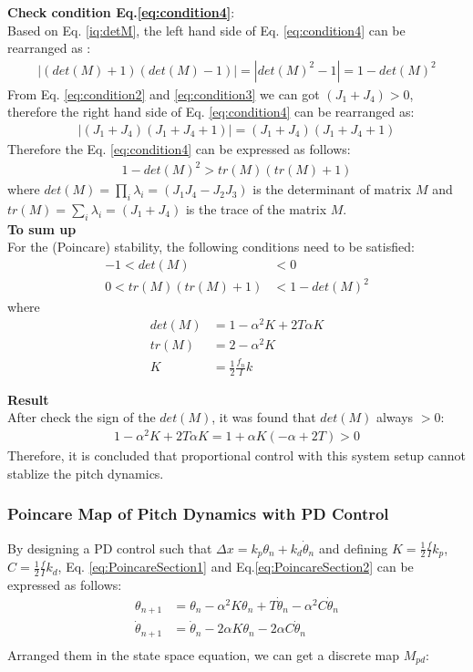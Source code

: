 \noindent \textbf{Check condition Eq.\ref{eq:condition4}}:\\
Based on Eq. \ref{iq:detM}, the left hand side of Eq. \ref{eq:condition4} can be rearranged as :
\begin{align*}
|(det(M)+1)(det(M)-1)| = |det(M)^2-1| = 1-det(M)^2
\end{align*}
From Eq. \ref{eq:condition2} and \ref{eq:condition3} we can got $(J_1+J_4)>0$, therefore the right hand side of Eq. \ref{eq:condition4} can be rearranged as:
\begin{align*}
|(J_1+J_4)(J_1+J_4 +1)| = (J_1+J_4)(J_1+J_4 +1)
\end{align*}
Therefore the Eq. \ref{eq:condition4} can be expressed as follows:
\begin{align*}
1-det(M)^2> tr(M) ( tr(M) + 1)
\end{align*}
where $det(M) = \prod\limits_{i}^{}\lambda_i = (J_1J_4-J_2J_3)$ is the determinant of matrix $M$ and $tr(M)=\sum\limits_{i}^{}\lambda_i = (J_1 + J_4)$ is the trace of the matrix $M$.\\

\noindent \textbf{To sum up}\\
For the (Poincare) stability, the following conditions need to be satisfied:
\begin{align}
-1<det(M)&<0\\
0< tr(M) ( tr(M) + 1)&<1-det(M)^2
\end{align}
where
\begin{align*}
det(M) &= 1- \alpha^2K + 2T\alpha K\\
tr(M) &= 2- \alpha^2K \\
K &= \frac{1}{2}\frac{f_n}{I}k
\end{align*}

\noindent \textbf{Result}\\
After check the sign of the $det(M)$, it was found that $det(M)$ always $>0$:
\begin{align*}
 1-\alpha^2K+2T\alpha K = 1 + \alpha K(-\alpha+2T)>0
\end{align*}
Therefore, it is concluded that proportional control with this system setup cannot stablize the pitch dynamics.
\pagebreak

\subsubsection{Poincare Map of Pitch Dynamics with PD Control}
By designing a PD control such that $\Delta x = k_p\theta_n+k_d\dot \theta_n$ and defining $K =\frac{1}{2} \frac{f}{I}k_p$, $C =\frac{1}{2} \frac{f}{I}k_d$, Eq. \ref{eq:PoincareSection1} and Eq.\ref{eq:PoincareSection2} can be expressed as follows:
\begin{align*}
\theta_{n+1} &= \theta_n  - \alpha^2 K \theta_n + T\dot \theta_n - \alpha^2 C \dot\theta_n\\
\dot \theta_{n+1} &= \dot \theta_n  - 2\alpha K \theta_n- 2\alpha C \dot\theta_n\\
\end{align*}
Arranged them in the state space equation, we can get a discrete map $M_{pd}$:

